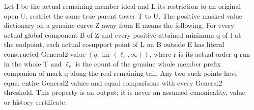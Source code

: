 \begin{definition}
\label{hir:member-masked-positive-value-dictionary}
\leanok
Let I be the actual remaining member ideal and L its restriction to an
original open U; restrict the same true parent tower T to U. The positive
masked value dictionary on a genuine curve Z away from E means the
following. For every actual global component B of Z and every positive
attained minimum q of I at the endpoint, each actual cosupport point of L
on B outside E has literal constructed General2 value
$(q,\operatorname{inr}(\ell_r,\infty))$, where r is its actual order-q run
in the whole T and $\ell_r$ is the count of the genuine whole member prefix
companion of mark q along the real remaining tail. Any two such points
have equal entire General2 values and equal comparisons with every
General2 threshold. This property is an output; it is never an assumed
canonicality, value or history certificate.
\end{definition}

